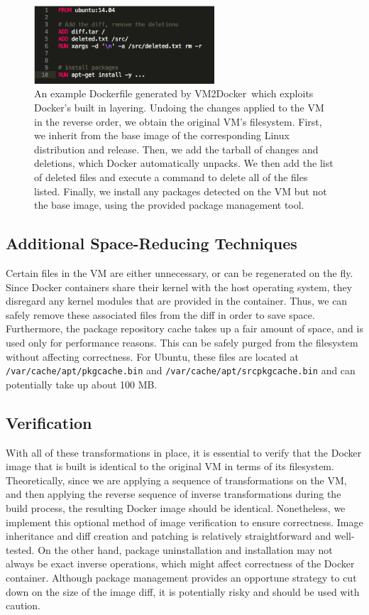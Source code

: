\documentclass[\myfontsize, letterpaper]{article}
\newcommand{\projectname}{VM2Docker}
\begin{document}
\begin{figure}[h]
\centering
    \includegraphics[width=0.6\textwidth]{dockerfile.png}
    \caption{An example Dockerfile generated by \projectname\ which exploits Docker's built in layering. Undoing the changes applied to the VM in the reverse order, we obtain the original VM's filesystem. First, we inherit from the base image of the corresponding Linux distribution and release. Then, we add the tarball of changes and deletions, which Docker automatically unpacks. We then add the list of deleted files and execute a command to delete all of the files listed. Finally, we install any packages detected on the VM but not the base image, using the provided package management tool.}
\end{figure}


\subsection{Additional Space-Reducing Techniques}
Certain files in the VM are either unnecessary, or can be regenerated on the fly. Since Docker containers share their kernel with the host operating system, they disregard any kernel modules that are provided in the container. Thus, we can safely remove these associated files from the diff in order to save space. Furthermore, the package repository cache takes up a fair amount of space, and is used only for performance reasons. This can be safely purged from the filesystem without affecting correctness. For Ubuntu, these files are located at \texttt{/var/cache/apt/pkgcache.bin} and \texttt{/var/cache/apt/srcpkgcache.bin} and can potentially take up about 100 MB.

\subsection{Verification}
With all of these transformations in place, it is essential to verify that the Docker image that is built is identical to the original VM in terms of its filesystem. Theoretically, since we are applying a sequence of transformations on the VM, and then applying the reverse sequence of inverse transformations during the build process, the resulting Docker image should be identical. Nonetheless, we implement this optional method of image verification to ensure correctness. Image inheritance and diff creation and patching is relatively straightforward and well-tested. On the other hand, package uninstallation and installation may not always be exact inverse operations, which might affect correctness of the Docker container. Although package management provides an opportune strategy to cut down on the size of the image diff, it is potentially risky and should be used with caution.
\end{document}
